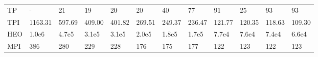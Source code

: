 \begin{table*}
{\begin{tabular}{llllllllllll}
TP       &                - &                21 &                19 &                20 &                20 &                40 &               77 &               91 &               25 &                93 &               93 \\
TPI      &          1163.31 &            597.69 &            409.00 &            401.82 &            269.51 &            249.37 &           236.47 &           121.77 &           120.35 &            118.63 &           109.30 \\
HEO      &            1.0e6 &             4.7e5 &             3.1e5 &             3.1e5 &             2.0e5 &             1.8e5 &            1.7e5 &            7.7e4 &            7.6e4 &             7.4e4 &            6.6e4 \\
MPI      &              386 &               280 &               229 &               228 &               176 &               175 &              177 &              122 &              123 &               122 &              123 \\
\bottomrule
\end{tabular}}
\end{table*}
